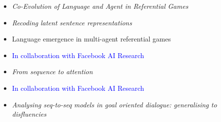 {{{
{\begin{itemize}
  \item[] \textit{Co-Evolution of Language and Agent in Referential Games}
\end{itemize}
}

{
{\begin{itemize}
  \item[] \textit{Recoding latent sentence representations}
\end{itemize}
}

{
{\begin{itemize}
  \item[] Language emergence in multi-agent referential games
  \item[] \textcolor{blue}{\normalfont In collaboration with Facebook AI Research\vspace{1mm}}
\end{itemize}
}

{
{\begin{itemize}
  \item[] \textit{From sequence to attention}
  \item[] \textcolor{blue}{\normalfont In collaboration with Facebook AI Research\vspace{1mm}}
\end{itemize}
}

{
{\begin{itemize}
  \item[] \textit{Analysing seq-to-seq models in goal oriented dialogue: generalising to disfluencies}
\end{itemize}
}

}}}}}}}
